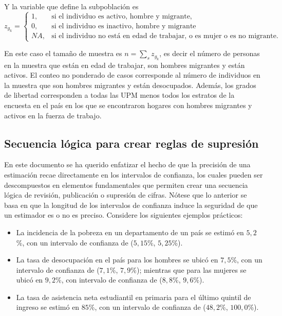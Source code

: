 \documentclass[
  12pt,
  spanish,
]{book}
\providecommand{\tightlist}{%
  \setlength{\itemsep}{0pt}\setlength{\parskip}{0pt}}
\begin{document}
Y la variable que define la subpoblación es
\[
z_{g_k}=
\begin{cases}
1, &\text{si el individuo es activo, hombre y migrante,}\\
0, &\text{si el individuo es inactivo, hombre y migrante}\\
NA, &\text{si el individuo no está en edad de trabajar, o es mujer o es no migrante.}
\end{cases}
\]

En este caso el tamaño de muestra es \(n = \sum_s z_{g_k}\), es decir el número de personas en la muestra que están en edad de trabajar, son hombres migrantes y están activos. El conteo no ponderado de casos corresponde al número de individuos en la muestra que son hombres migrantes y están desocupados. Además, los grados de libertad corresponden a todas las UPM menos todos los estratos de la encuesta en el país en los que se encontraron hogares con hombres migrantes y activos en la fuerza de trabajo.

\hypertarget{secuencia-luxf3gica-para-crear-reglas-de-supresiuxf3n}{%
\subsection{Secuencia lógica para crear reglas de supresión}\label{secuencia-luxf3gica-para-crear-reglas-de-supresiuxf3n}}

En este documento se ha querido enfatizar el hecho de que la precisión de una estimación recae directamente en los intervalos de confianza, los cuales pueden ser descompuestos en elementos fundamentales que permiten crear una secuencia lógica de revisión, publicación o supresión de cifras. Nótese que lo anterior se basa en que la longitud de los intervalos de confianza induce la seguridad de que un estimador es o no es preciso. Considere los siguientes ejemplos prácticos:

\begin{itemize}
\tightlist
\item
  La incidencia de la pobreza en un departamento de un país se estimó en \(5,2\)\%, con un intervalo de confianza de (\(5,15\)\%, \(5,25\)\%).
\item
  La tasa de desocupación en el país para los hombres se ubicó en \(7,5\)\%, con un intervalo de confianza de (\(7,1\)\%, \(7,9\)\%); mientras que para las mujeres se ubicó en \(9,2\)\%, con intervalo de confianza de (\(8,8\)\%, \(9,6\)\%).
\item
  La tasa de asistencia neta estudiantil en primaria para el último quintil de ingreso se estimó en \(85\)\%, con un intervalo de confianza de (\(48,2\)\%, \(100,0\)\%).
\end{itemize}
\end{document}
